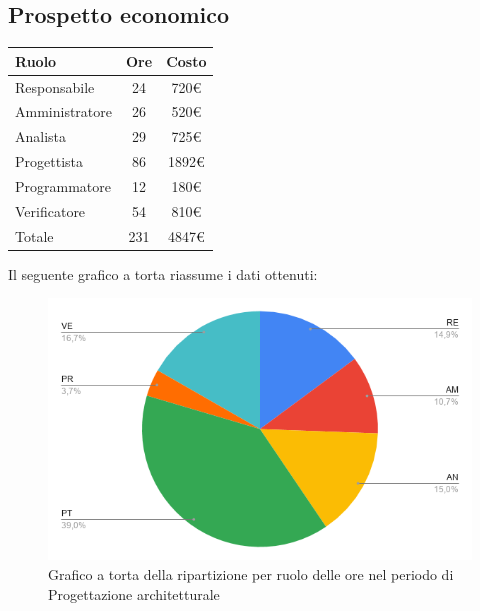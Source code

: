 {{{{{\subsection{Prospetto economico}\label{PreventivoFaseDiProgettazioneArchitetturaleProspettoEconomico}
\quad
\def\tabularxcolumn#1{m{#1}}
{
	\begin{center}
		\renewcommand{\arraystretch}{1.4}
		\begin{tabularx}{7cm}{|X|c|c|}
			\hline
			\rowcolor{airforceblue}
			\textbf{Ruolo} & \textbf{Ore} & \textbf{Costo}\\
			\hline
			Responsabile & 24 & 720\euro\\
			\hline
			Amministratore & 26 & 520\euro\\
			\hline
			Analista & 29 & 725\euro\\
			\hline
			Progettista & 86 & 1892\euro\\
			\hline
			Programmatore & 12 & 180\euro\\
			\hline
			Verificatore & 54 & 810\euro\\
			\hline
			Totale & 231 & 4847\euro\\
			\hline
		\end{tabularx}
	\end{center}

Il seguente grafico a torta riassume i dati ottenuti:
\begin{figure}[!ht]
	\begin{center}
		\includegraphics[width=0.8\linewidth]{../immagini/pdp/torta_progettazione_architetturale.png}
		\caption{Grafico a torta della ripartizione per ruolo delle ore nel periodo di Progettazione architetturale}
	\end{center}
\end{figure}

}}}}}}

